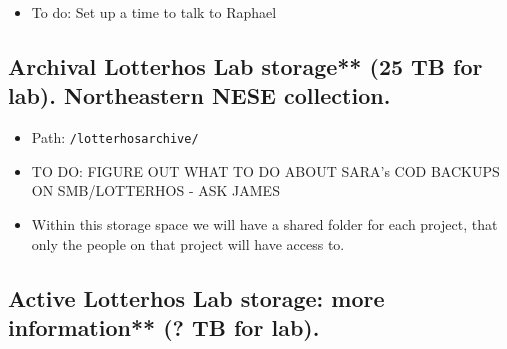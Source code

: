 \documentclass[
  letterpaper,
  DIV=11,
  numbers=noendperiod]{scrreprt}
\providecommand{\tightlist}{%
  \setlength{\itemsep}{0pt}\setlength{\parskip}{0pt}}\usepackage{longtable,booktabs,array}
\begin{document}
\begin{itemize}
\tightlist
\item
  To do: Set up a time to talk to Raphael
\end{itemize}

\hypertarget{archival-lotterhos-lab-storage-25-tb-for-lab.-northeastern-nese-collection.}{%
\subsection*{\texorpdfstring{\textbf{Archival Lotterhos Lab storage**
(25 TB for lab). Northeastern NESE
collection.}}{Archival Lotterhos Lab storage** (25 TB for lab). Northeastern NESE collection.}}\label{archival-lotterhos-lab-storage-25-tb-for-lab.-northeastern-nese-collection.}}

\begin{itemize}
\item
  Path: \texttt{/lotterhosarchive/}
\item
  TO DO: FIGURE OUT WHAT TO DO ABOUT SARA's COD BACKUPS ON SMB/LOTTERHOS
  - ASK JAMES
\item
  Within this storage space we will have a shared folder for each
  project, that only the people on that project will have access to.
\end{itemize}

\hypertarget{active-lotterhos-lab-storage-more-information-tb-for-lab.}{%
\subsection*{\texorpdfstring{\textbf{Active Lotterhos Lab storage: more
information** (? TB for
lab).}}{Active Lotterhos Lab storage: more information** (? TB for lab).}}\label{active-lotterhos-lab-storage-more-information-tb-for-lab.}}
\end{document}
